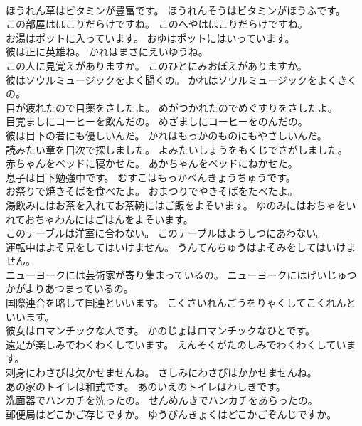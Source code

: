 \documentclass[8pt]{extreport}
\begin{document}
\begin{CJK}{UTF8}{min}
\\	ほうれん草はビタミンが豊富です。	ほうれんそうはビタミンがほうふです。 
\\	この部屋はほこりだらけですね。	このへやはほこりだらけですね。 
\\	お湯はポットに入っています。	おゆはポットにはいっています。 
\\	彼は正に英雄ね。	かれはまさにえいゆうね。 
\\	この人に見覚えがありますか。	このひとにみおぼえがありますか。 
\\	彼はソウルミュージックをよく聞くの。	かれはソウルミュージックをよくきくの。 
\\	目が疲れたので目薬をさしたよ。	めがつかれたのでめぐすりをさしたよ。 
\\	目覚ましにコーヒーを飲んだの。	めざましにコーヒーをのんだの。 
\\	彼は目下の者にも優しいんだ。	かれはもっかのものにもやさしいんだ。 
\\	読みたい章を目次で探しました。	よみたいしょうをもくじでさがしました。 
\\	赤ちゃんをベッドに寝かせた。	あかちゃんをベッドにねかせた。 
\\	息子は目下勉強中です。	むすこはもっかべんきょうちゅうです。 
\\	お祭りで焼きそばを食べたよ。	おまつりでやきそばをたべたよ。 
\\	湯飲みにはお茶を入れてお茶碗にはご飯をよそいます。	ゆのみにはおちゃをいれておちゃわんにはごはんをよそいます。 
\\	このテーブルは洋室に合わない。	このテーブルはようしつにあわない。 
\\	運転中はよそ見をしてはいけません。	うんてんちゅうはよそみをしてはいけません。 
\\	ニューヨークには芸術家が寄り集まっているの。	ニューヨークにはげいじゅつかがよりあつまっているの。 
\\	国際連合を略して国連といいます。	こくさいれんごうをりゃくしてこくれんといいます。 
\\	彼女はロマンチックな人です。	かのじょはロマンチックなひとです。 
\\	遠足が楽しみでわくわくしています。	えんそくがたのしみでわくわくしています。 
\\	刺身にわさびは欠かせませんね。	さしみにわさびはかかせませんね。 
\\	あの家のトイレは和式です。	あのいえのトイレはわしきです。 
\\	洗面器でハンカチを洗ったの。	せんめんきでハンカチをあらったの。 
\\	郵便局はどこかご存じですか。	ゆうびんきょくはどこかごぞんじですか。 

\end{CJK}
\end{document}
